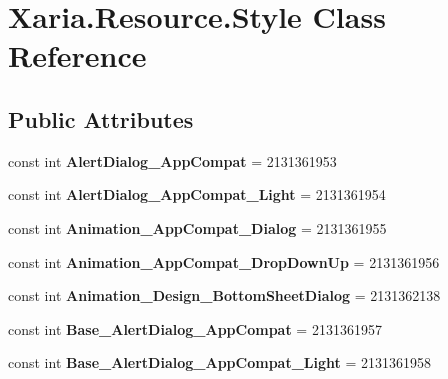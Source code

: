 \hypertarget{classXaria_1_1Resource_1_1Style}{}\section{Xaria.\+Resource.\+Style Class Reference}
\label{classXaria_1_1Resource_1_1Style}
\subsection*{Public Attributes}
\begin{DoxyCompactItemize}
\item 
\mbox{\label{classXaria_1_1Resource_1_1Style_a12f9a9d32b1384064b3454f3f4633328}} 
const int {\bfseries Alert\+Dialog\+\_\+\+App\+Compat} = 2131361953
\item 
\mbox{\label{classXaria_1_1Resource_1_1Style_aff5e65e5ff2e06fa867d0f4ae4f5e64b}} 
const int {\bfseries Alert\+Dialog\+\_\+\+App\+Compat\+\_\+\+Light} = 2131361954
\item 
\mbox{\label{classXaria_1_1Resource_1_1Style_af67b9775b0183c7dffca33ecfccf5bec}} 
const int {\bfseries Animation\+\_\+\+App\+Compat\+\_\+\+Dialog} = 2131361955
\item 
\mbox{\label{classXaria_1_1Resource_1_1Style_a5d7ced93c2559ca50c7f597513eaf62f}} 
const int {\bfseries Animation\+\_\+\+App\+Compat\+\_\+\+Drop\+Down\+Up} = 2131361956
\item 
\mbox{\label{classXaria_1_1Resource_1_1Style_a59ca25655789d579e625f50fdc3bc8e9}} 
const int {\bfseries Animation\+\_\+\+Design\+\_\+\+Bottom\+Sheet\+Dialog} = 2131362138
\item 
\mbox{\label{classXaria_1_1Resource_1_1Style_a245ce5ff90b609de4c5e1e355255e6b5}} 
const int {\bfseries Base\+\_\+\+Alert\+Dialog\+\_\+\+App\+Compat} = 2131361957
\item 
\mbox{\label{classXaria_1_1Resource_1_1Style_a57f353443f7cd41f7f35b19780dbd03b}} 
const int {\bfseries Base\+\_\+\+Alert\+Dialog\+\_\+\+App\+Compat\+\_\+\+Light} = 2131361958

\end{DoxyCompactItemize}
